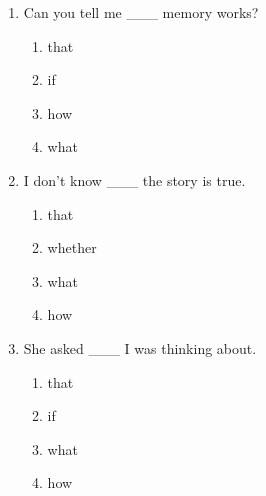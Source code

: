 \documentclass[11pt,a4paper]{ctexart}
\begin{document}
\begin{enumerate}[leftmargin=*,itemsep=4pt]
\begin{enumerate}[label=\Alph*.,leftmargin=2em,itemsep=1pt,topsep=2pt]
\end{enumerate}
\item Can you tell me \_\_\_ memory works?
\begin{enumerate}[label=\Alph*.,leftmargin=2em,itemsep=1pt,topsep=2pt]
\item that
\item if
\item how
\item what
\end{enumerate}
\item I don't know \_\_\_ the story is true.
\begin{enumerate}[label=\Alph*.,leftmargin=2em,itemsep=1pt,topsep=2pt]
\item that
\item whether
\item what
\item how
\end{enumerate}
\item She asked \_\_\_ I was thinking about.
\begin{enumerate}[label=\Alph*.,leftmargin=2em,itemsep=1pt,topsep=2pt]
\item that
\item if
\item what
\item how
\end{enumerate}
\end{enumerate}
\end{document}
